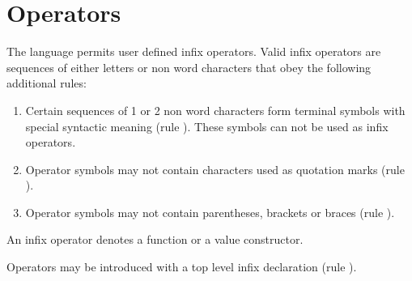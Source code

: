 \section{Operators} \label{operator}   \label{fixity} 

The \frege{} language permits user defined infix operators.
Valid infix operators are sequences of either letters or non word characters that obey the following additional rules:

\begin{enumerate}

\item Certain sequences of 1 or 2 non word characters form
terminal symbols with special syntactic meaning
(rule ).
These symbols can not be used as infix operators.

\item Operator symbols may not contain characters used as quotation
marks (rule ).

\item Operator symbols may not contain parentheses, brackets or braces (rule ).

\end{enumerate}

An infix operator denotes a function or a
value constructor.

Operators may be introduced with a top level infix declaration (rule ).

\begin{flushleft}
   
\\
  \oder{}  \oder{} \\
 \regex{[123456789]} \oder{} \\

  \\
 \\
  \oder{} \\
   \oder{} \\
 \regex{::} \oder{}
   \regex{->} \oder{}
   \regex{<-} \oder{} \regex{=>} \oder{}
   \regex{$\backslash{}|$} \oder{}
   \regex{=} \oder{} \regex{-} \oder{}
   \regex{!} \oder{}  \oder{}
   \regex{,} \oder{} \regex{;} \oder{}
    \oder{}
   \regex{$\backslash{}\backslash{}$} \oder{}
   \regex{\_}\\

 \regex{$\backslash{}$(} \oder{} \regex{$\backslash{}$)} \oder{} \regex{$\backslash{}$[} \oder{} \regex{$\backslash{}$]} \oder{} \regex{$\backslash{}$\{} \oder{} \regex{$\backslash{}$\}}\\

 \regex{["'\#`]}\\
\end{flushleft}

